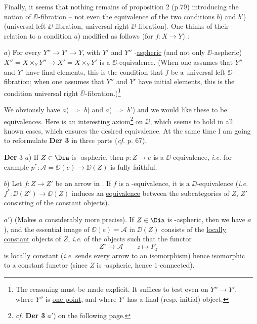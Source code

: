 
Finally, it seems that nothing remains of proposition 2 (p.79) introducing the notion of $\DD$-fibration – not even the equivalence of the two conditions $b$) and $b'$) (universal left $\DD$-fibration, universal right $\DD$-fibration). One thinks of their relation to a condition $a$) modified as follows (for $f : X \to Y$) :

$a$) For every $Y'' \to Y' \to Y$, with $Y'$ and $Y''$ \Hot-\underline{aspheric} (and not only $\DD$-aspheric) $X'' = X \times_Y Y'' \to X' = X \times_Y Y'$ is a $\DD$-equivalence. (When one assumes that $Y''$ and $Y'$ have final elements, this is the condition that $f$ be a universal left $\DD$-fibration; when one assumes that $Y''$ and $Y'$ have initial elements, this is the condition universal right $\DD$-fibration.)\footnote[48]{The reasoning must be made explicit. It suffices to test even on $Y'' \to Y'$, where $Y''$ is \underline{one-point}, and where $Y'$ has a final (resp. initial) object.}

We obviously have $a$) $\Rightarrow$ $b$) and $a$) $\Rightarrow$ $b'$) and we would like these to be equivalences. Here is an interesting axiom\footnote[49]{\textit{cf.} \textbf{Der 3} $a'$) on the following page.} on $\DD$, which seems to hold in all known cases, which ensures the desired equivalence. At the same time I am going to reformulate \textbf{Der 3} in three parts (\textit{cf.} p. 67).

\textbf{Der} 3 $a$) If $Z \in \Dia$ is \Hot-aspheric, then $p : Z \to e$ is a $\DD$-equivalence, \textit{i.e.} for example $p^* : \mathcal{A} = \DD(e) \to \DD(Z)$ is fully faithful.

$b$) Let $f : Z \to Z'$ be an arrow in \Dia. If $f$ is a \Hot-equivalence, it is a $\DD$-equivalence (\textit{i.e.} $f^* : \DD(Z') \to \DD(Z)$ induces an \underline{equivalence} between the subcategories of $Z$, $Z'$ consisting of the constant objects).

$a'$) (Makes $a$ considerably more precise). If $Z \in \Dia$ is \Hot-aspheric, then we have $a$), and the essential image of $\DD(e) = \mathcal{A}$ in $\DD(Z)$ consists of the \underline{locally} \underline{constant} objects of $Z$, \textit{i.e.} of the objects such that the functor
\[
Z^{\circ} \longrightarrow \mathcal{A} \qquad z \longmapsto F_z
\]
is locally constant (\textit{i.e.} sends every arrow to an isomorphism) hence isomorphic to a constant functor (since $Z$ is \Hot-aspheric, hence 1-connected).

